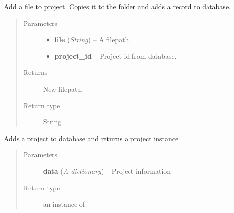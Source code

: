 \documentclass[letterpaper,10pt,english]{sphinxmanual}
\begin{document}

\begin{fulllineitems}
\label{api:controller.AddFileToProject}
Add a file to project. Copies it to the folder and adds a record to database.
\begin{quote}\begin{description}
\item[{Parameters}] \leavevmode\begin{itemize}
\item {} 
\textbf{file} (\emph{String}) -- A filepath.

\item {} 
\textbf{project\_id} -- Project id from database.

\end{itemize}

\item[{Returns}] \leavevmode
New filepath.

\item[{Return type}] \leavevmode
String

\end{description}\end{quote}

\end{fulllineitems}


\begin{fulllineitems}
\label{api:controller.AddProject}
Adds a project to database and returns a  project instance
\begin{quote}\begin{description}
\item[{Parameters}] \leavevmode
\textbf{data} (\emph{A dictionary}) -- Project information

\item[{Return type}] \leavevmode
an instance of {\hyperref[api:models.Project]{}}

\end{description}\end{quote}

\end{fulllineitems}

\end{document}
